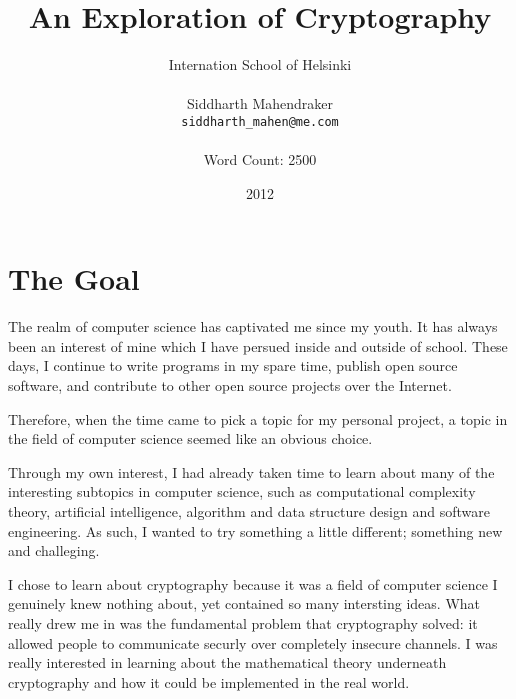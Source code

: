 \documentclass[12pt, a4paper, draft]{report}
\begin{document}
\renewcommand*\thesection{\arabic{section}}
\renewcommand{\cftsecfont}{\bfseries}

\setlength\cftbeforesecskip{5pt}

\title{An Exploration of Cryptography}
\author{Internation School of Helsinki\\\\
    Siddharth Mahendraker\\
    \texttt{siddharth\_mahen@me.com}\\\\
    Word Count: 2500}
\date{2012}
\maketitle

\setcounter{page}{1}
\tableofcontents
\clearpage

\section*{The Goal}
\setcounter{page}{1}


The realm of computer science has captivated me since my youth. It has
always been an interest of mine which I have persued inside and outside
of school. These days, I continue to write programs in my spare time,
publish open source software, and contribute to other open source
projects over the Internet.

Therefore, when the time came to pick a topic for my personal project,
a topic in the field of computer science seemed like an obvious choice.

Through my own interest, I had already taken time to learn about many
of the interesting subtopics in computer science, such as computational
complexity theory, artificial intelligence, algorithm and data structure
design and software engineering. As such, I wanted to try something
a little different; something new and challeging.

I chose to learn about cryptography because it was a field of computer
science I genuinely knew nothing about, yet contained so many intersting
ideas. What really drew me in was the fundamental problem that cryptography
solved: it allowed people to communicate securly over completely insecure
channels. I was really interested in learning about the mathematical theory
underneath cryptography and how it could be implemented in the real world.
\end{document}
